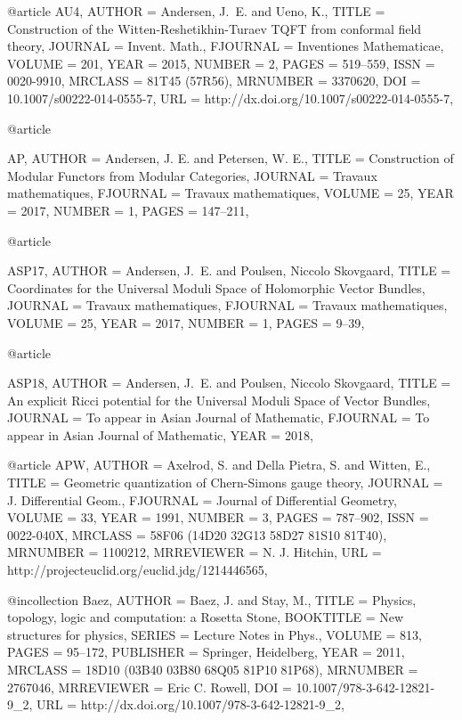 @article {AU4,
    AUTHOR = {Andersen, J.~E. and Ueno, K.},
     TITLE = {Construction of the {W}itten-{R}eshetikhin-{T}uraev {TQFT}
              from conformal field theory},
   JOURNAL = {Invent. Math.},
  FJOURNAL = {Inventiones Mathematicae},
    VOLUME = {201},
      YEAR = {2015},
    NUMBER = {2},
     PAGES = {519--559},
      ISSN = {0020-9910},
   MRCLASS = {81T45 (57R56)},
  MRNUMBER = {3370620},
       DOI = {10.1007/s00222-014-0555-7},
       URL = {http://dx.doi.org/10.1007/s00222-014-0555-7},
}

@article {AP,
    AUTHOR = {{Andersen}, J. E. and {Petersen}, W. E.},
     TITLE = {Construction of Modular Functors from Modular Categories},
   JOURNAL = {Travaux mathematiques},
  FJOURNAL = {Travaux mathematiques},
    VOLUME = {25},
      YEAR = {2017},
    NUMBER = {1},
     PAGES = {147--211},
      
}

@article {ASP17,
    AUTHOR = {Andersen, J.~E. and Poulsen, Niccolo Skovgaard},
     TITLE = {Coordinates for the Universal Moduli Space of Holomorphic Vector Bundles},
   JOURNAL = {Travaux mathematiques},
  FJOURNAL = {Travaux mathematiques},
    VOLUME = {25},
      YEAR = {2017},
    NUMBER = {1},
     PAGES = {9--39},
      
}

@article {ASP18,
    AUTHOR = {Andersen, J.~E. and Poulsen, Niccolo Skovgaard},
     TITLE = {An explicit Ricci potential for the Universal Moduli Space of Vector Bundles},
   JOURNAL = {To appear in Asian Journal of Mathematic},
  FJOURNAL = {To appear in Asian Journal of Mathematic},
      YEAR = {2018},
  
      
}




@article {APW,
    AUTHOR = {Axelrod, S. and Della Pietra, S. and Witten, E.},
     TITLE = {Geometric quantization of {C}hern-{S}imons gauge theory},
   JOURNAL = {J. Differential Geom.},
  FJOURNAL = {Journal of Differential Geometry},
    VOLUME = {33},
      YEAR = {1991},
    NUMBER = {3},
     PAGES = {787--902},
      ISSN = {0022-040X},
   MRCLASS = {58F06 (14D20 32G13 58D27 81S10 81T40)},
  MRNUMBER = {1100212},
MRREVIEWER = {N. J. Hitchin},
       URL = {http://projecteuclid.org/euclid.jdg/1214446565},
}

@incollection {Baez,
    AUTHOR = {Baez, J. and Stay, M.},
     TITLE = {Physics, topology, logic and computation: a {R}osetta {S}tone},
 BOOKTITLE = {New structures for physics},
    SERIES = {Lecture Notes in Phys.},
    VOLUME = {813},
     PAGES = {95--172},
 PUBLISHER = {Springer, Heidelberg},
      YEAR = {2011},
   MRCLASS = {18D10 (03B40 03B80 68Q05 81P10 81P68)},
  MRNUMBER = {2767046},
MRREVIEWER = {Eric C. Rowell},
       DOI = {10.1007/978-3-642-12821-9_2},
       URL = {http://dx.doi.org/10.1007/978-3-642-12821-9_2},
}

